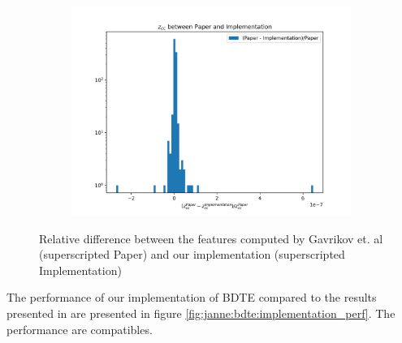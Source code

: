 \documentclass[../main.tex]{subfiles}
\begin{document}
\begin{figure}[ht]
\begin{subfigure}[t]{0.32\linewidth}
    \includegraphics[width=\linewidth]{images/janne/bdte/z_cc_diff.png}
  \end{subfigure}
  \caption{Relative difference between the features computed by Gavrikov et. al (superscripted Paper) and our implementation (superscripted Implementation)}
  \label{fig:janne:feat_diff}
\end{figure}

The performance of our implementation of BDTE compared to the results presented in \cite{gavrikov_energy_2022} are presented in figure \ref{fig:janne:bdte:implementation_perf}. The performance are compatibles.
\end{document}
